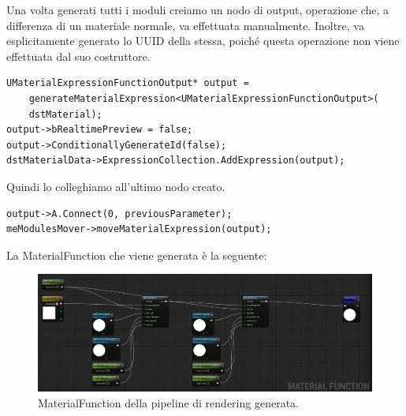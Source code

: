 \documentclass[main.tex]{subfiles}
\begin{document}
\noindent Una volta generati tutti i moduli creiamo un nodo di output, operazione che, a differenza di un materiale normale, va effettuata manualmente. Inoltre, va esplicitamente generato lo UUID della stessa, poiché questa operazione non viene effettuata dal suo costruttore. 
\begin{lstlisting}
UMaterialExpressionFunctionOutput* output =
    generateMaterialExpression<UMaterialExpressionFunctionOutput>(
    dstMaterial);
output->bRealtimePreview = false;
output->ConditionallyGenerateId(false);
dstMaterialData->ExpressionCollection.AddExpression(output);
\end{lstlisting}
Quindi lo colleghiamo all'ultimo nodo creato.
\begin{lstlisting}
output->A.Connect(0, previousParameter);
meModulesMover->moveMaterialExpression(output);
\end{lstlisting}
\clearpage
La MaterialFunction che viene generata è la seguente:
\begin{figure}[H]
    \centering
    \includegraphics[width=1\linewidth]{img/renderingPipeline/GeneratedPipelineFull.jpg}
    \caption{MaterialFunction della pipeline di rendering generata.}
    \label{fig:2_generatedMFpipeline}
\end{figure}
\end{document}
